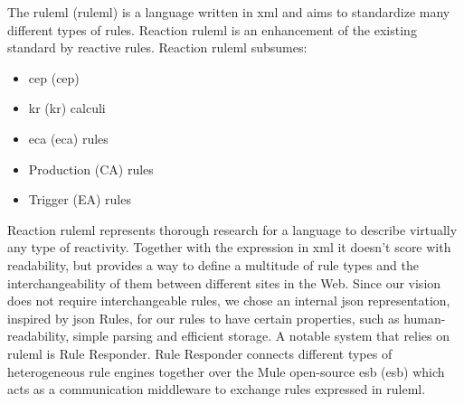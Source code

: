 The \textrm{\acrlong{ruleml} (\acrshort{ruleml})}\cite{2006-Boley-RuleML.pdf} is a language written in \textrm{\acrshort{xml}} and aims to standardize many different types of rules.
\textrm{Reaction \acrshort{ruleml}}\cite{2012-Paschke_etal-ReactionRuleML.pdf} is an enhancement of the existing standard by reactive rules.
\textrm{Reaction \acrshort{ruleml}} subsumes:
\begin{itemize}
  \item \textrm{\acrlong{cep} (\acrshort{cep})}
  \item \textrm{\acrlong{kr} (\acrshort{kr})} calculi
  \item \textrm{\acrlong{eca} (\acrshort{eca})} rules
  \item Production (\textrm{CA}) rules
  \item Trigger (\textrm{EA}) rules
\end{itemize}
\textrm{Reaction \acrshort{ruleml}} represents thorough research for a language to describe virtually any type of reactivity.
Together with the expression in \textrm{\acrshort{xml}} it doesn't score with readability, but provides a way to define a multitude of rule types and the interchangeability of them between different sites in the Web.
Since our vision does not require interchangeable rules, we chose an internal \textrm{\acrshort{json}} representation, inspired by \textrm{\acrshort{json} Rules}, for our rules to have certain properties, such as human-readability, simple parsing and efficient storage.
A notable system that relies on \textrm{\acrshort{ruleml}} is \textrm{Rule Responder}\cite{2007-Paschke_etal-RuleResponder.pdf}.
\textrm{Rule Responder} connects different types of heterogeneous rule engines together over the \textrm{Mule} open-source \textrm{\acrlong{esb} (\acrshort{esb})} which acts as a communication middleware to exchange rules expressed in \textrm{\acrshort{ruleml}}.

